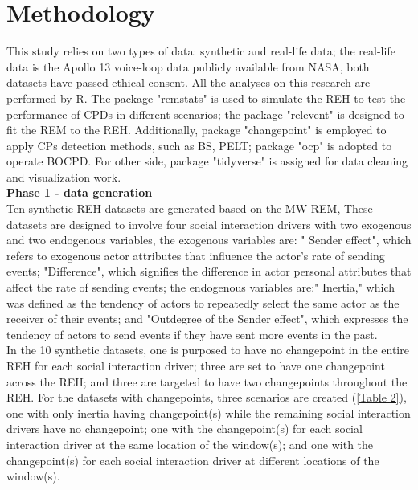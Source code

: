 \documentclass[]{interact}
\theoremstyle{plain}%
\theoremstyle{definition}
\theoremstyle{remark}
\begin{document}
\section{\fontsize{14}{15}\selectfont Methodology}

\hspace{0.2cm} This study relies on two types of data: synthetic and real-life data; the real-life data is the Apollo 13 voice-loop data publicly available from NASA, both datasets have passed ethical consent. All the analyses on this research are performed by R. The package "remstats" is used to simulate the REH to test the performance of CPDs in different scenarios; the package "relevent" is designed to fit the REM to the REH. Additionally, package "changepoint" is employed to apply CPs detection methods, such as BS, PELT; package "ocp" is adopted to operate BOCPD. For other side, package "tidyverse" is assigned for data cleaning and visualization work.\\

\hspace{-0.55cm} \textbf{Phase 1 - data generation}\\

Ten synthetic REH datasets are generated based on the MW-REM, These datasets are designed to involve four social interaction drivers with two exogenous and two endogenous variables, the exogenous variables are: " Sender effect", which refers to exogenous actor attributes that influence the actor's rate of sending events; "Difference", which signifies the difference in actor personal attributes that affect the rate of sending events; the endogenous variables are:" Inertia," which was defined as the tendency of actors to repeatedly select the same actor as the receiver of their events; and "Outdegree of the Sender effect", which expresses the tendency of actors to send events if they have sent more events in the past. \\

In the 10 synthetic datasets, one is purposed to have no changepoint in the entire REH for each social interaction driver; three are set to have one changepoint across the REH; and three are targeted to have two changepoints throughout the REH. For the datasets with changepoints, three scenarios are created (\autoref{Table 2}), one with only inertia having changepoint(s) while the remaining social interaction drivers have no changepoint; one with the changepoint(s) for each social interaction driver at the same location of the window(s); and one with the changepoint(s) for each social interaction driver at different locations of the window(s). \\
\end{document}
